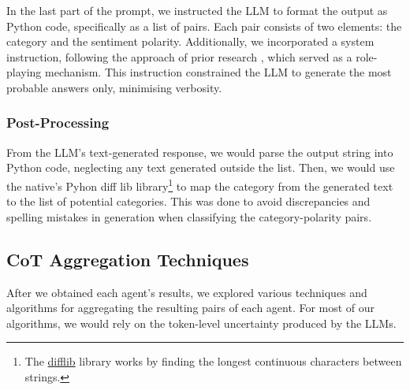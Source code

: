 \documentclass[11pt]{article}
\begin{document}



In the last part of the prompt, we instructed the LLM to format the output as Python code, specifically as a list of pairs. Each pair consists of two elements: the category and the sentiment polarity. Additionally, we incorporated a system instruction, following the approach of prior research \citep{10499502}, which served as a role-playing mechanism. This instruction constrained the LLM to generate the most probable answers only, minimising verbosity. 


\subsubsection{Post-Processing}
From the LLM's text-generated response, we would parse the output string into Python code, neglecting any text generated outside the list. Then, we would use the native's Pyhon diff lib library\footnote{The \href{https://github.com/python/cpython/blob/main/Lib/difflib.py}{difflib} library works by finding the longest continuous characters between strings.} to map the category from the generated text to the list of potential categories. This was done to avoid discrepancies and spelling mistakes in generation when classifying the category-polarity pairs.

\subsection{CoT Aggregation Techniques}
\label{sec:aggregation_techniques}
After we obtained each agent's results, we explored various techniques and algorithms for aggregating the resulting pairs of each agent. For most of our algorithms, we would rely on the token-level uncertainty produced by the LLMs. 
\end{document}
